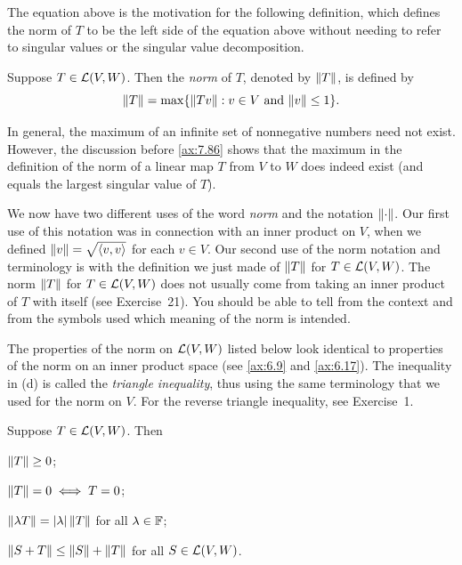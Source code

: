 The equation above is the motivation for the following definition, which
defines the norm of $T$ to be the left side of the equation above without
needing to refer to singular values or the singular value decomposition.

\begin{definition}\label{ax:7.86}
Suppose $T\in\mathcal{L}(V,W)$. Then the \emph{norm} of $T$, denoted by $\lVert T \rVert$, is
defined by
\[ \lVert T \rVert = \max\{\lVert Tv \rVert : v\in V \text{ and } \lVert v \rVert\le1\}. \]
\end{definition}

In general, the maximum of an infinite set of nonnegative numbers need not
exist. However, the discussion before \ref{ax:7.86} shows that the maximum in
the definition of the norm of a linear map $T$ from $V$ to $W$ does indeed
exist (and equals the largest singular value of $T$).

We now have two different uses of the word \emph{norm} and the notation
$\lVert \cdot \rVert$. Our first use of this notation was in connection with an inner
product on $V$, when we defined $\lVert v \rVert=\sqrt{\langle v, v \rangle}$ for each $v\in V$.
Our second use of the norm notation and terminology is with the definition we
just made of $\lVert T \rVert$ for $T\in\mathcal{L}(V,W)$. The norm $\lVert T \rVert$ for
$T\in\mathcal{L}(V,W)$ does not usually come from taking an inner product of $T$ with
itself (see Exercise~21). You should be able to tell from the context and from
the symbols used which meaning of the norm is intended.

The properties of the norm on $\mathcal{L}(V,W)$ listed below look identical to
properties of the norm on an inner product space (see \ref{ax:6.9} and
\ref{ax:6.17}). The inequality in (d) is called the \emph{triangle inequality},
thus using the same terminology that we used for the norm on $V$. For the
reverse triangle inequality, see Exercise~1.

\begin{result}\label{ax:7.87}
Suppose $T\in\mathcal{L}(V,W)$. Then
\begin{parts}
\item $\lVert T \rVert\ge0$;
\item $\lVert T \rVert=0 \iff T=0$;
\item $\lVert \lambda T \rVert=\lvert \lambda \rvert\,\lVert T \rVert$ for all $\lambda\in\mathbb{F}$;
\item $\lVert S+T \rVert\le\lVert S \rVert+\lVert T \rVert$ for all $S\in\mathcal{L}(V,W)$.
\end{parts}
\end{result}

